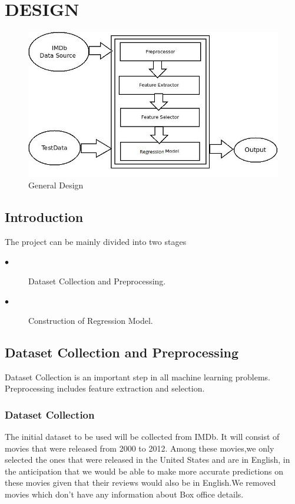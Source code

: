 \chapter{DESIGN}
\begin{figure}[h!]
  \centering
      \includegraphics[scale=0.7]{Diagram.jpg}
  \caption{General Design}
\end{figure}
\section{Introduction}
The project can be mainly divided into two stages
\begin{description}
\item[$\bullet$ ]Dataset Collection and Preprocessing.
\item[$\bullet$ ]Construction of Regression Model.
\end{description}
\section{Dataset Collection and Preprocessing}
Dataset Collection is an important step in all machine learning problems. Preprocessing includes feature extraction and selection.
\subsection{Dataset Collection}
The initial dataset to be used will be collected from IMDb. It will consist of movies that were released from 2000 to 2012. Among these movies,we only selected the ones that were released in the United States and are in English, in the anticipation that we would be able to make more accurate predictions on these movies given that their reviews would also be in English.We removed movies which don't have any information about Box office details. 
